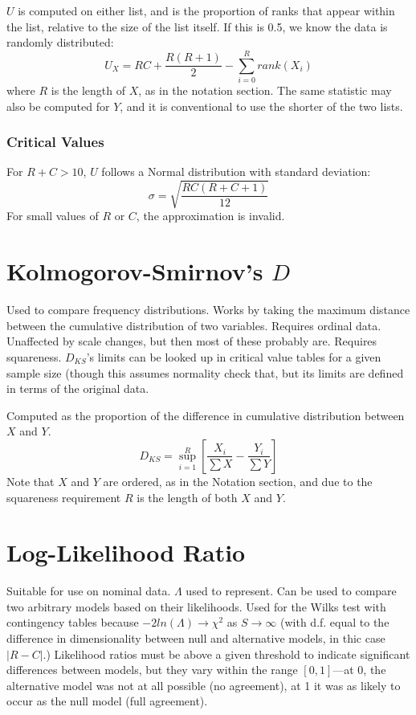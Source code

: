 \documentclass[11pt]{article}
\begin{document}
$U$ is computed on either list, and is the proportion of ranks that appear within the list, relative to the size of the list itself.  If this is 0.5, we know the data is randomly distributed:
$$
U_X = RC + \frac{ R(R+1) }{ 2 } - \sum_{i=0}^{R}{ rank(X_i) }
$$
where $R$ is the length of $X$, as in the notation section.  The same statistic may also be computed for $Y$, and it is conventional to use the shorter of the two lists.

\subsubsection{Critical Values}
For $R+C > 10$, $U$ follows a Normal distribution with standard deviation:
$$
\sigma = \sqrt{  \frac{  RC(R + C + 1)  }{  12 } }
$$
For small values of $R$ or $C$, the approximation is invalid.







\section{Kolmogorov-Smirnov's $D$}
Used to compare frequency distributions.  Works by taking the maximum distance between the cumulative distribution of two variables.  Requires ordinal data.  Unaffected by scale changes, but then most of these probably are.  Requires squareness.  $D_{KS}$'s limits can be looked up in critical value tables for a given sample size (though this assumes normality {\color{red} check that}, but its limits are defined in terms of the original data.

Computed as the proportion of the difference in cumulative distribution between $X$ and $Y$.
$$
D_{KS} = \sup_{i=1}^{R}\left[ \frac{ X_i }{ \sum{X} } - \frac{Y_i}{ \sum{Y} } \right]
$$
Note that $X$ and $Y$ are ordered, as in the Notation section, and due to the squareness requirement $R$ is the length of both $X$ and $Y$.






\section{Log-Likelihood Ratio}
Suitable for use on nominal data.  $\Lambda$ used to represent.  Can be used to compare two arbitrary models based on their likelihoods.  Used for the Wilks test with contingency tables because $-2ln(\Lambda) \to \chi^2$ as $S \to \infty$ (with d.f. equal to the difference in dimensionality between null and alternative models, in thic case $|R-C|$.)  Likelihood ratios must be above a given threshold to indicate significant differences between models, but they vary within the range $[0, 1]$---at 0, the alternative model was not at all possible (no agreement), at 1 it was as likely to occur as the null model (full agreement).
\end{document}
